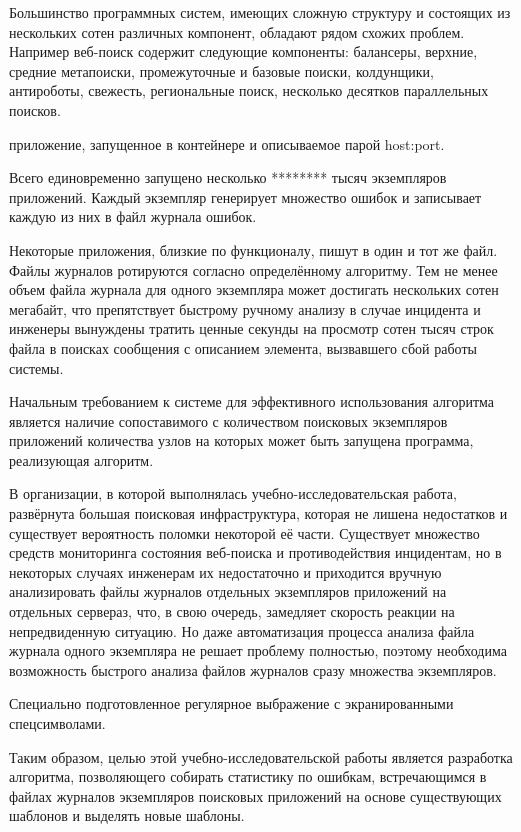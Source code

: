 Большинство программных систем, имеющих сложную структуру и состоящих из
нескольких сотен различных компонент, обладают рядом схожих проблем.
Например веб-поиск содержит следующие компоненты:
балансеры, верхние, средние метапоиски, промежуточные и базовые поиски,
колдунщики, антироботы, свежесть, региональные поиск,
несколько десятков параллельных поисков.


\begin{definition}[Экземпляр]
  приложение, запущенное в контейнере и описываемое парой host:port.
\end{definition}
Всего единовременно запущено несколько ******** тысяч экземпляров приложений.
Каждый экземпляр генерирует множество ошибок и записывает каждую из них в
файл журнала ошибок.

Некоторые приложения, близкие по функционалу, пишут в один и тот же файл.
Файлы журналов ротируются согласно определённому алгоритму. Тем не менее объем
файла журнала для одного экземпляра может достигать нескольких сотен мегабайт,
что препятствует быстрому ручному анализу в случае инцидента и инженеры
вынуждены тратить ценные секунды на просмотр сотен тысяч строк файла в поисках
сообщения с описанием элемента, вызвавшего сбой работы системы.

Начальным требованием к системе для эффективного использования алгоритма
является наличие сопоставимого с количеством поисковых экземпляров
приложений количества узлов на которых может быть запущена программа,
реализующая алгоритм.

В организации, в которой выполнялась учебно-исследовательская работа,
развёрнута большая поисковая инфраструктура, которая не лишена недостатков и
существует вероятность поломки некоторой её части. Существует множество
средств мониторинга состояния веб-поиска и противодействия инцидентам,
но в некоторых случаях инженерам их недостаточно и приходится вручную
анализировать файлы журналов отдельных экземпляров приложений на отдельных
сервераз, что, в свою очередь, замедляет скорость реакции на непредвиденную
ситуацию. Но даже автоматизация процесса анализа файла журнала одного
экземпляра не решает проблему полностью, поэтому необходима возможность
быстрого анализа файлов журналов сразу множества экземпляров.

\begin{definition}[Шаблон]
  Специально подготовленное регулярное выбражение с экранированными
  спецсимволами.
\end{definition}
Таким образом, целью этой учебно-исследовательской работы является разработка
алгоритма, позволяющего собирать статистику по ошибкам, встречающимся
в файлах журналов экземпляров поисковых приложений на основе существующих
шаблонов и выделять новые шаблоны.
